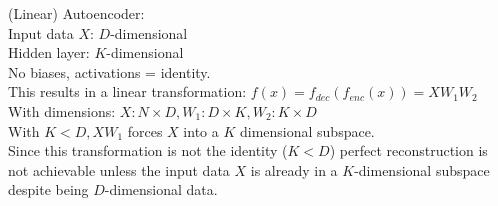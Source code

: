 

\newcommand{\ExerciseNumber}{12}

\newcommand{\PersonOne}{Marcel Bruckner (03674122)}
\newcommand{\PersonTwo}{Julian Hohenadel (03673879)}
\newcommand{\PersonThree}{Kevin Bein (03707775)}






%
%
%
%
%
%
\begin{flushleft}
(Linear) Autoencoder:
\\
Input data $X$: $D$-dimensional\\
Hidden layer: $K$-dimensional\\
No biases, activations = identity.\\
This results in a linear transformation: $f(x) = f_{dec}(f_{enc}(x))= X W_1 W_2$\\
With dimensions: $X: N \times D, W_1: D \times K, W_2: K \times D$\\
With $K < D, X W_1$ forces $X$ into a $K$ dimensional subspace.\\
Since this transformation is not the identity ($K < D$) perfect reconstruction is
not achievable unless the input data $X$ is already in a $K$-dimensional subspace despite being $D$-dimensional data.

\end{flushleft}
%
%
%
%
%
%
%
%
%
%
%




